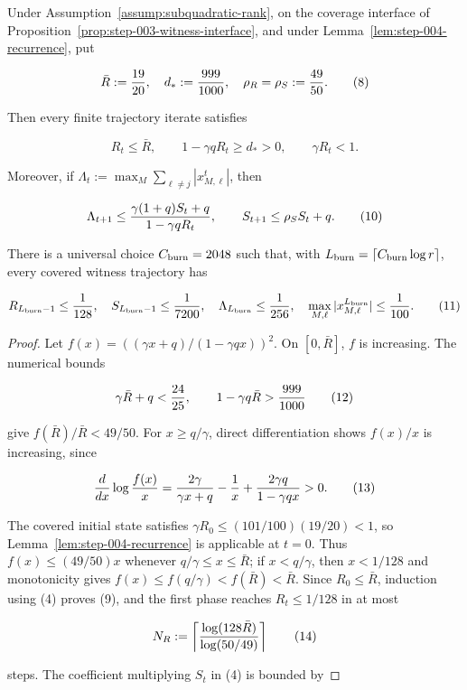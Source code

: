 \begin{proposition}\label{prop:step-004-envelope}
Under Assumption~\ref{assump:subquadratic-rank}, on the coverage interface
of Proposition~\ref{prop:step-003-witness-interface}, and under
Lemma~\ref{lem:step-004-recurrence}, put

\[
\bar R:={19\over20},\quad d_*:={999\over1000},\quad
\rho_R=\rho_S:={49\over50}.
\tag{8}
\]

Then every finite trajectory iterate satisfies

\[
R_t\le\bar R,\qquad 1-\gamma qR_t\ge d_*>0,\qquad \gamma R_t<1.
\tag{9}
\]

Moreover, if \(\Lambda_t:=\max_M\sum_{\ell\ne j}|x_{M,\ell}^t|\), then

\[
\Lambda_{t+1}\le {\gamma(1+q)S_t+q\over1-\gamma qR_t},\qquad
S_{t+1}\le\rho_S S_t+q.
\tag{10}
\]

There is a universal choice \(C_{\rm burn}=2048\) such that, with
\(L_{\rm burn}=\lceil C_{\rm burn}\log r\rceil\), every covered witness
trajectory has

\[
R_{L_{\rm burn}-1}\le {1\over128},\quad
S_{L_{\rm burn}-1}\le {1\over7200},\quad
\Lambda_{L_{\rm burn}}\le {1\over256},\quad
\max_{M,\ell}|x_{M,\ell}^{L_{\rm burn}}|\le {1\over100}.
\tag{11}
\]

\begin{proof}
Let
\(f(x)=((\gamma x+q)/(1-\gamma qx))^2\). On
\([0,\bar R]\), \(f\) is increasing. The numerical bounds

\[
\gamma\bar R+q < {24\over25},\qquad
1-\gamma q\bar R>{999\over1000}
\tag{12}
\]

give \(f(\bar R)/\bar R<49/50\). For \(x\ge q/\gamma\), direct
differentiation shows \(f(x)/x\) is increasing, since

\[
{d\over dx}\log{f(x)\over x}
={2\gamma\over\gamma x+q}-{1\over x}
 +{2\gamma q\over1-\gamma qx}>0.
\tag{13}
\]

The covered initial state satisfies \(\gamma R_0\le(101/100)(19/20)<1\),
so Lemma~\ref{lem:step-004-recurrence} is applicable at \(t=0\).
Thus \(f(x)\le(49/50)x\) whenever \(q/\gamma\le x\le\bar R\); if
\(x<q/\gamma\), then \(x<1/128\) and monotonicity gives
\(f(x)\le f(q/\gamma)<f(\bar R)<\bar R\). Since \(R_0\le\bar R\),
induction using
(4) proves (9), and the first phase reaches \(R_t\le1/128\) in at most

\[
N_R:=\left\lceil{\log(128\bar R)\over\log(50/49)}\right\rceil
\tag{14}
\]

steps. The coefficient multiplying \(S_t\) in (4) is bounded by


\end{proof}
\end{proposition}
